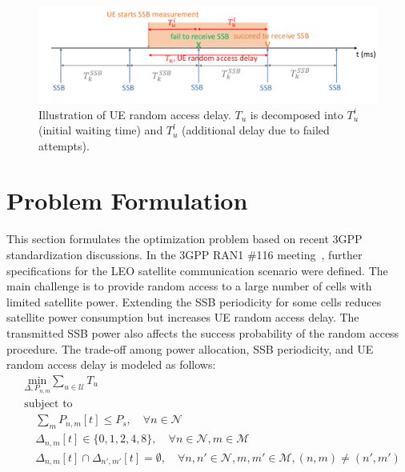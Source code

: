 \begin{figure}[h!]
    \centering
    \includegraphics[width=1\textwidth]{figure/random access delay.pdf}
    \caption{Illustration of UE random access delay. $T_u$ is decomposed into $T_u^i$ (initial waiting time) and $T_u^l$ (additional delay due to failed attempts).}
    \label{RAD}
\end{figure}

\section{Problem Formulation}
This section formulates the optimization problem based on recent 3GPP standardization discussions. In the 3GPP RAN1 \#116 meeting~\cite{ran1-116}, further specifications for the LEO satellite communication scenario were defined. The main challenge is to provide random access to a large number of cells with limited satellite power. Extending the SSB periodicity for some cells reduces satellite power consumption but increases UE random access delay. The transmitted SSB power also affects the success probability of the random access procedure. The trade-off among power allocation, SSB periodicity, and UE random access delay is modeled as follows:
\begin{equation}
\begin{aligned}
    & \underset{\Delta, P_{n, m}}{\text{min}} \sum_{u \in \mathcal{U}} T_u \\
    & \text{subject to} \\
    & \quad \sum_{m} P_{n,m}[t] \leq P_s, \quad \forall n \in \mathcal{N} \\
    & \quad \Delta_{n, m}[t] \in \{0, 1, 2, 4, 8\}, \quad \forall n \in \mathcal{N}, m \in \mathcal{M} \\
    & \quad \Delta_{n, m}[t] \cap \Delta_{n', m'}[t] = \emptyset, \quad \forall n, n' \in \mathcal{N}, m, m' \in \mathcal{M}, (n, m) \neq (n', m')
\end{aligned}
\end{equation}

